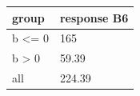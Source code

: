 \begingroup\small
\setlength{\tabcolsep}{3pt}
\renewcommand{\arraystretch}{1.04}
\begin{tabularx}{\linewidth}{XX}
\toprule
group & response B6 \\
\midrule
b \textless{}= 0 & 165 \\
b \textgreater{} 0 & 59.39 \\
all & 224.39 \\
\bottomrule
\end{tabularx}
\endgroup
